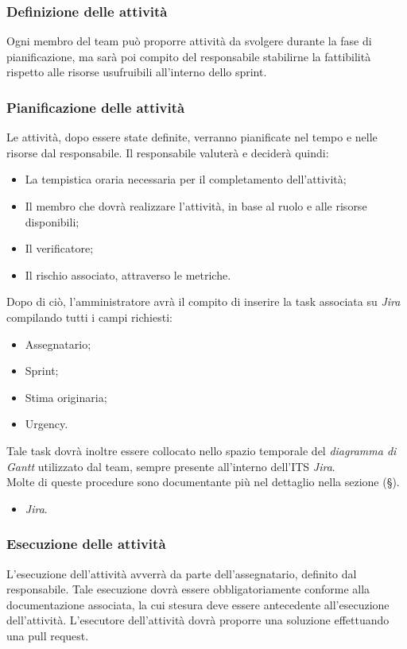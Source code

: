 \documentclass[10pt, a4paper]{article}
\begin{document}
\subsubsection{Definizione delle attività}
Ogni membro del team può proporre attività da svolgere durante la fase di pianificazione, ma sarà poi compito del responsabile stabilirne 
la fattibilità rispetto alle risorse usufruibili all'interno dello sprint.
\subsubsection{Pianificazione delle attività}
Le attività, dopo essere state definite, verranno pianificate nel tempo e nelle risorse dal responsabile. Il responsabile valuterà e deciderà quindi:
\begin{itemize}
    \item La tempistica oraria necessaria per il completamento dell'attività;
    \item Il membro che dovrà realizzare l'attività, in base al ruolo e alle risorse disponibili;
    \item Il verificatore;
    \item Il rischio associato, attraverso le metriche.
\end{itemize}
Dopo di ciò, l'amministratore avrà il compito di inserire la task associata su \textit{Jira} compilando tutti i campi richiesti:
\begin{itemize}
    \item Assegnatario;
    \item Sprint;
    \item Stima originaria;
    \item Urgency.
\end{itemize}
Tale task dovrà inoltre essere collocato nello spazio temporale del \textit{diagramma di Gantt} utilizzato dal team, sempre presente all'interno dell'ITS \textit{Jira}.\\
Molte di queste procedure sono documentante più nel dettaglio nella sezione (\S {}).
\begin{itemize}
    \item \textit{Jira}.
\end{itemize}
\subsubsection{Esecuzione delle attività}
L'esecuzione dell'attività avverrà da parte dell'assegnatario, definito dal responsabile. Tale esecuzione dovrà essere obbligatoriamente conforme alla documentazione associata, la cui stesura deve essere antecedente all'esecuzione dell'attività. L'esecutore dell'attività dovrà proporre una soluzione effettuando una pull request.
\end{document}
